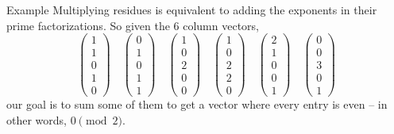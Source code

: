 \documentclass[aspectratio=169]{beamer}
\begin{document}
\begin{frame}{Example}
  Multiplying residues is equivalent to adding the exponents in their prime factorizations.
  So given the 6 column vectors,
  \[
  \begin{pmatrix} 1 \\ 1 \\ 0 \\ 1 \\ 0 \end{pmatrix} \quad
  \begin{pmatrix} 0 \\ 1 \\ 0 \\ 1 \\ 1 \end{pmatrix} \quad
  \begin{pmatrix} 1 \\ 0 \\ 2 \\ 0 \\ 0 \end{pmatrix} \quad
  \begin{pmatrix} 1 \\ 0 \\ 2 \\ 2 \\ 0 \end{pmatrix} \quad
  \begin{pmatrix} 2 \\ 1 \\ 0 \\ 0 \\ 1 \end{pmatrix} \quad
  \begin{pmatrix} 0 \\ 0 \\ 3 \\ 0 \\ 1 \end{pmatrix}
  \] \pause
  our goal is to sum some of them to get a vector where every entry is even
  -- in other words, $0 \pmod{2}$.
\end{frame}
\end{document}
